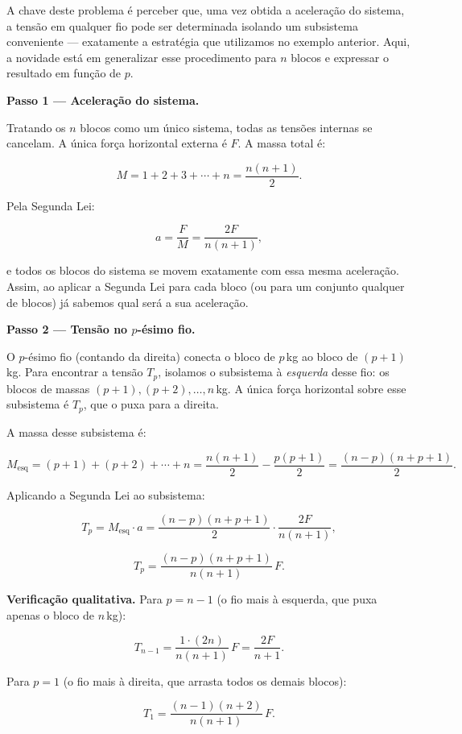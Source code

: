 \begin{exemplo}
A chave deste problema é perceber que, uma vez obtida a aceleração do
sistema, a tensão em qualquer fio pode ser determinada isolando um
subsistema conveniente --- exatamente a estratégia que utilizamos no
exemplo anterior. Aqui, a novidade está em generalizar esse
procedimento para $n$ blocos e expressar o resultado em função de $p$.

\medskip
\noindent\textbf{Passo 1 — Aceleração do sistema.}

Tratando os $n$ blocos como um único sistema, todas as tensões internas
se cancelam. A única força horizontal externa é $F$. A massa total é:

\[
  M = 1 + 2 + 3 + \cdots + n = \frac{n(n+1)}{2}.
\]

Pela Segunda Lei:

\[
  a = \frac{F}{M} = \frac{2F}{n(n+1)},
\]

\noindent e todos os blocos do sistema se movem exatamente com essa mesma aceleração. Assim, ao aplicar a Segunda Lei para cada bloco (ou para um conjunto qualquer de blocos) já sabemos qual será a sua aceleração.

\noindent\textbf{Passo 2 — Tensão no $p$-ésimo fio.}

O $p$-ésimo fio (contando da direita) conecta o bloco de $p$\,kg ao
bloco de $(p+1)$\,kg. Para encontrar a tensão $T_p$, isolamos o
subsistema à \emph{esquerda} desse fio: os blocos de massas
$(p+1), (p+2), \ldots, n$\,kg. A única força horizontal sobre esse
subsistema é $T_p$, que o puxa para a direita.

A massa desse subsistema é:

\[
  M_{\text{esq}} = (p+1) + (p+2) + \cdots + n
  = \frac{n(n+1)}{2} - \frac{p(p+1)}{2}
  = \frac{(n-p)(n+p+1)}{2}.
\]

Aplicando a Segunda Lei ao subsistema:

\[
  T_p = M_{\text{esq}}\cdot a
      = \frac{(n-p)(n+p+1)}{2} \cdot \frac{2F}{n(n+1)},
\]

\[
  \boxed{T_p = \frac{(n-p)(n+p+1)}{n(n+1)}\,F.}
\]

\noindent\textbf{Verificação qualitativa.} Para $p = n-1$ (o fio mais
à esquerda, que puxa apenas o bloco de $n$\,kg):

\[
  T_{n-1} = \frac{1 \cdot (2n)}{n(n+1)}\,F = \frac{2F}{n+1}.
\]

Para $p = 1$ (o fio mais à direita, que arrasta todos os demais blocos):

\[
  T_1 = \frac{(n-1)(n+2)}{n(n+1)}\,F.
\]


\end{exemplo}
